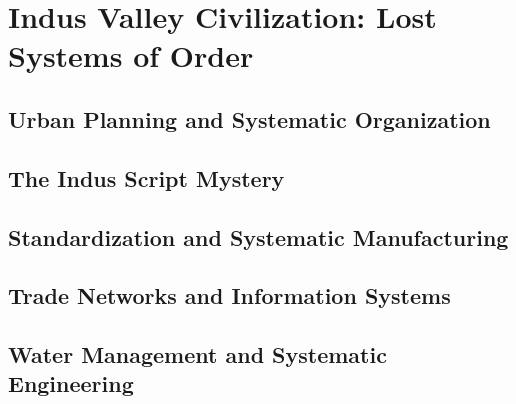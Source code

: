 
\chapter{Indus Valley Civilization: Lost Systems of Order}

\section{Urban Planning and Systematic Organization}

\section{The Indus Script Mystery}

\section{Standardization and Systematic Manufacturing}

\section{Trade Networks and Information Systems}

\section{Water Management and Systematic Engineering}

